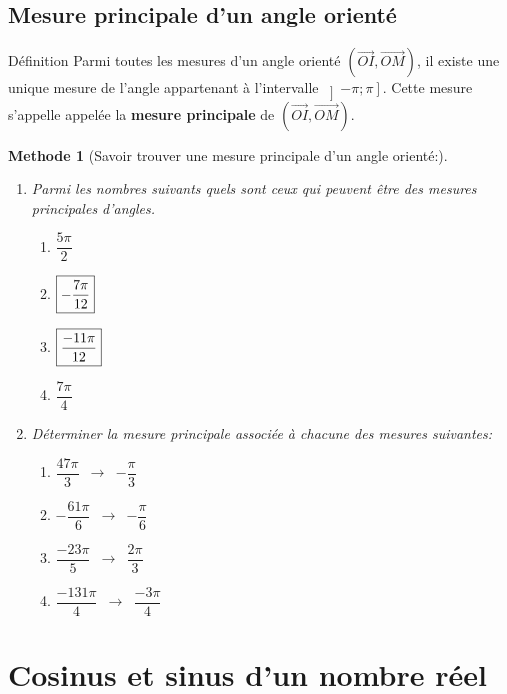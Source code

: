 \documentclass[10pt,a4paper]{article}
\newcommand{\VE}[1]{\overrightarrow{#1}}
\theoremstyle{break}
\newtheorem{Meth}{Methode}
\begin{document}
		\subsection{Mesure principale d'un angle orienté}
			\begin{bclogo}[couleur = yellow!30, arrondi = 0.1,logo=\bcbook]{Définition}
			Parmi toutes les mesures d'un angle orienté $(\VE{OI}, \VE{OM})$, il existe une unique mesure de l'angle appartenant à l'intervalle $\left] -\pi;\pi\right] $. Cette mesure s'appelle  appelée la \textbf{mesure principale} de $(\VE{OI}, \VE{OM})$.
		\end{bclogo}

		\begin{Meth}[Savoir trouver une mesure principale d'un angle orienté:]
			\begin{enumerate}
				\item Parmi les nombres suivants quels sont ceux qui peuvent être des mesures principales d'angles.
				\begin{multicols}{4}
					\begin{enumerate}
						\item $\dfrac{5\pi}{2}$
						\item $\fbox{$-\dfrac{7\pi}{12}$}$
						\item $\fbox{$\dfrac{-11\pi}{12}$}$
						\item $\dfrac{7\pi}{4}$
					\end{enumerate}
				\end{multicols}


				\item Déterminer la mesure principale associée à chacune des mesures suivantes:
				\begin{multicols}{4}
					\begin{enumerate}
						\item $\dfrac{47\pi}{3}$~$\rightarrow$~$-\dfrac{\pi}{3}$
						\item $-\dfrac{61\pi}{6}$~$\rightarrow$~$-\dfrac{\pi}{6}$
						\item $\dfrac{-23\pi}{5}$~$\rightarrow$~$\dfrac{2\pi}{3}$
						\item $\dfrac{-131\pi}{4}$~$\rightarrow$~$\dfrac{-3\pi}{4}$
					\end{enumerate}
				\end{multicols}
			\end{enumerate}
		\end{Meth}
	
		\section{Cosinus et sinus d'un nombre réel}
\end{document}
